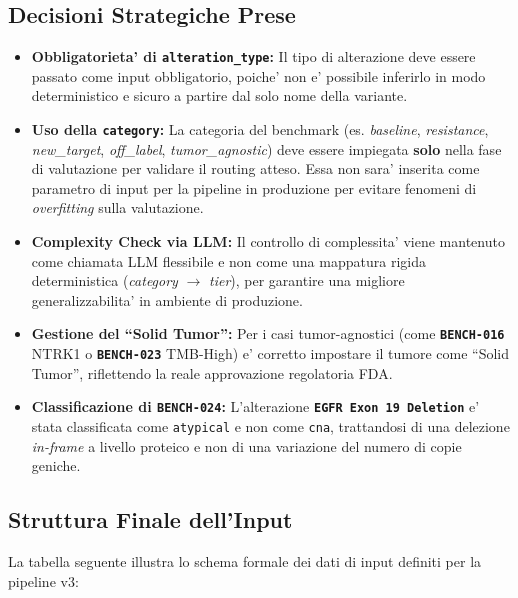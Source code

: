 \documentclass[12pt, a4paper]{article}
\newcommand{\bench}[1]{{\texttt{\textbf{#1}}}}
\begin{document}
\subsection{Decisioni Strategiche Prese}
\begin{itemize}[leftmargin=1.6em, itemsep=4pt]
  \item \textbf{Obbligatorieta' di \texttt{alteration\_type}:} Il tipo di alterazione deve essere passato come input obbligatorio, poiche' non e' possibile inferirlo in modo deterministico e sicuro a partire dal solo nome della variante.
  \item \textbf{Uso della \texttt{category}:} La categoria del benchmark (es. \textit{baseline}, \textit{resistance}, \textit{new\_target}, \textit{off\_label}, \textit{tumor\_agnostic}) deve essere impiegata \textbf{solo} nella fase di valutazione per validare il routing atteso. Essa non sara' inserita come parametro di input per la pipeline in produzione per evitare fenomeni di \textit{overfitting} sulla valutazione.
  \item \textbf{Complexity Check via LLM:} Il controllo di complessita' viene mantenuto come chiamata LLM flessibile e non come una mappatura rigida deterministica (\textit{category} $\to$ \textit{tier}), per garantire una migliore generalizzabilita' in ambiente di produzione.
  \item \textbf{Gestione del ``Solid Tumor'':} Per i casi tumor-agnostici (come \bench{BENCH-016} NTRK1 o \bench{BENCH-023} TMB-High) e' corretto impostare il tumore come ``Solid Tumor'', riflettendo la reale approvazione regolatoria FDA.
  \item \textbf{Classificazione di \bench{BENCH-024}:} L'alterazione \bench{EGFR Exon 19 Deletion} e' stata classificata come \texttt{atypical} e non come \texttt{cna}, trattandosi di una delezione \textit{in-frame} a livello proteico e non di una variazione del numero di copie geniche.
\end{itemize}

\subsection{Struttura Finale dell'Input}
La tabella seguente illustra lo schema formale dei dati di input definiti per la pipeline v3:
\end{document}
